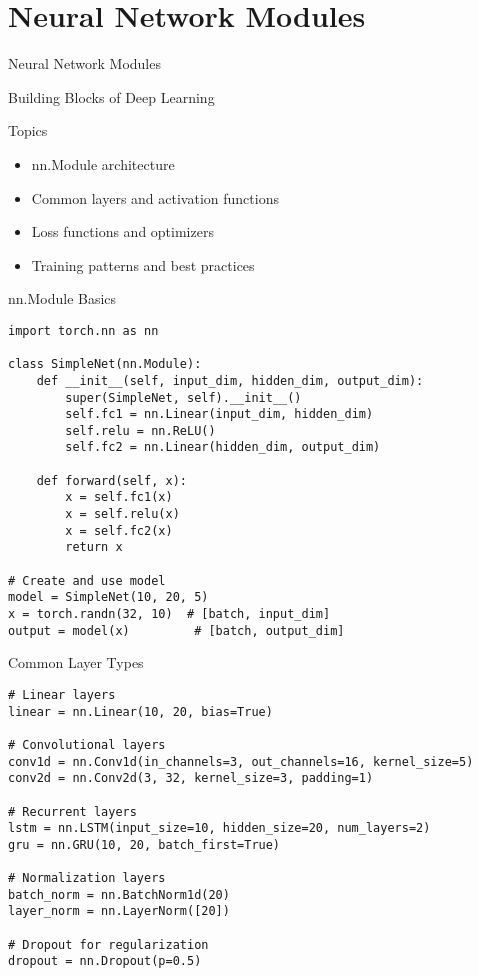 \documentclass[aspectratio=169,10pt]{beamer}
\begin{document}
\section{Neural Network Modules}

\begin{frame}{Neural Network Modules}
\begin{center}
\Large{Building Blocks of Deep Learning}
\end{center}

\begin{block}{Topics}
\begin{itemize}
    \item nn.Module architecture
    \item Common layers and activation functions
    \item Loss functions and optimizers
    \item Training patterns and best practices
\end{itemize}
\end{block}
\end{frame}

\begin{frame}[fragile]{nn.Module Basics}
\begin{lstlisting}
import torch.nn as nn

class SimpleNet(nn.Module):
    def __init__(self, input_dim, hidden_dim, output_dim):
        super(SimpleNet, self).__init__()
        self.fc1 = nn.Linear(input_dim, hidden_dim)
        self.relu = nn.ReLU()
        self.fc2 = nn.Linear(hidden_dim, output_dim)
    
    def forward(self, x):
        x = self.fc1(x)
        x = self.relu(x)
        x = self.fc2(x)
        return x

# Create and use model
model = SimpleNet(10, 20, 5)
x = torch.randn(32, 10)  # [batch, input_dim]
output = model(x)         # [batch, output_dim]
\end{lstlisting}
\end{frame}

\begin{frame}[fragile]{Common Layer Types}
\begin{lstlisting}
# Linear layers
linear = nn.Linear(10, 20, bias=True)

# Convolutional layers
conv1d = nn.Conv1d(in_channels=3, out_channels=16, kernel_size=5)
conv2d = nn.Conv2d(3, 32, kernel_size=3, padding=1)

# Recurrent layers
lstm = nn.LSTM(input_size=10, hidden_size=20, num_layers=2)
gru = nn.GRU(10, 20, batch_first=True)

# Normalization layers
batch_norm = nn.BatchNorm1d(20)
layer_norm = nn.LayerNorm([20])

# Dropout for regularization
dropout = nn.Dropout(p=0.5)
\end{lstlisting}
\end{frame}
\end{document}
